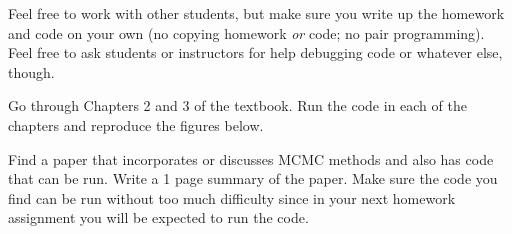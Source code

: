 \documentclass[12pt,letterpaper]{pset}
\begin{document}
Feel free to work with other students, but make sure you write up the homework
and code on your own (no copying homework \textit{or} code; no pair programming).
Feel free to ask students or instructors for help debugging code or whatever else,
though.\\

\begin{problem}[1]
  Go through Chapters 2 and 3 of the textbook. Run the code in each of the
  chapters and reproduce the figures below.
\end{problem}

\begin{solution}
    \vfill
\end{solution}

\newpage

\begin{problem}[2]
  Find a paper that incorporates or discusses MCMC methods and also has code
  that can be run. Write a 1 page summary of the paper. Make sure the code you
  find can be run without too much difficulty since in your next homework
  assignment you will be expected to run the code.
\end{problem}

\begin{solution}
    \vfill
\end{solution}

\newpage
\end{document}
